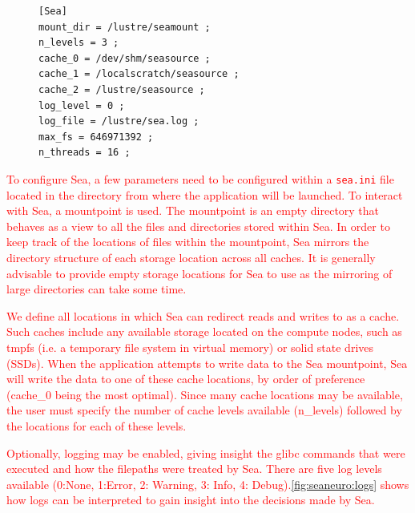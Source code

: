 \documentclass[pdflatex,sn-mathphys-num]{sn-jnl}
\newcommand{\vhs}[1]{\textcolor{red}{#1}}
\theoremstyle{thmstyleone}%
\theoremstyle{thmstyletwo}%
\theoremstyle{thmstylethree}%
\begin{document}
    \begin{figure}
      \centering
       \begin{lstlisting}[style=myyamlstyle, caption={Example Sea configuration file (sea.ini)}, label=lst:seaini]
[Sea]                                                                  
mount_dir = /lustre/seamount ;                                    
n_levels = 3 ;                                                        
cache_0 = /dev/shm/seasource ;                                           
cache_1 = /localscratch/seasource ;                                         
cache_2 = /lustre/seasource ;                                    
log_level = 0 ;                                 
log_file = /lustre/sea.log ;                             
max_fs = 646971392 ;                                                   
n_threads = 16 ;    \end{lstlisting}
    \end{figure}
   

    \vhs{To configure Sea, a few parameters need to be configured within a \texttt{sea.ini} file located in the directory from where the application will be launched. To interact with Sea, a mountpoint is used. The mountpoint
    is an empty directory that behaves as a view to all the files and
    directories stored within Sea. In order to keep track of the locations of
    files within the mountpoint, Sea mirrors the directory structure of each
    storage location across all caches. It is generally advisable to provide
    empty storage locations for Sea to use as the mirroring of large directories
    can take some time.}

    \vhs{We define all locations in which Sea can redirect reads and  writes to as a cache. Such
    caches include any available storage located on the compute nodes, such as
    tmpfs (i.e. a temporary file system in virtual memory) or solid state drives (SSDs). When the application attempts to write
    data to the Sea mountpoint, Sea will write the data to one of these cache locations, by order of preference (cache\_0 being the most optimal).
    Since many cache locations may be available, the user must specify the number of cache levels available (n\_levels) followed by the locations for each of these levels.}

    \vhs{Optionally, logging may be enabled, giving insight the glibc commands that were executed and how the filepaths were treated by Sea. There are five log levels
    available (0:None, 1:Error, 2: Warning, 3: Info, 4: Debug).\autoref{fig:seaneuro:logs} shows how logs can be interpreted to gain insight into the decisions made by Sea.}
\end{document}
